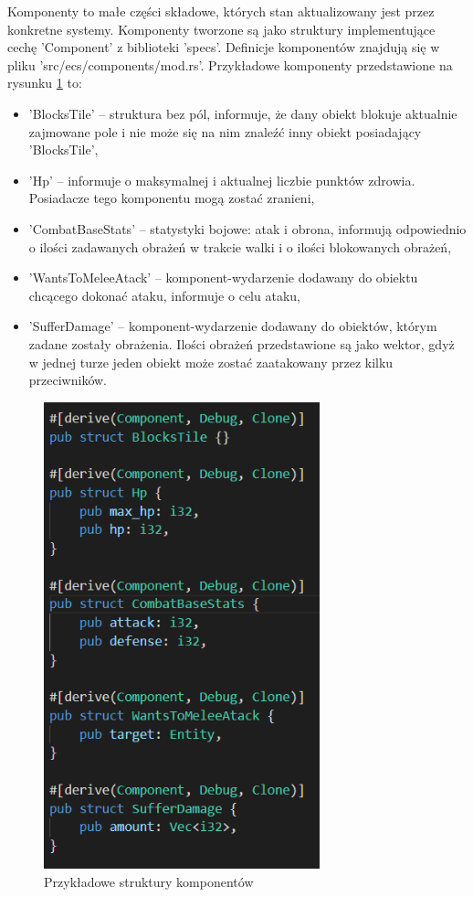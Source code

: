 \documentclass[12pt,twoside]{article}
\begin{document}
Komponenty to małe części składowe, których stan aktualizowany jest przez konkretne systemy. Komponenty tworzone są jako struktury implementujące cechę 'Component' z biblioteki 'specs'. Definicje komponentów znajdują się w pliku 'src/ecs/components/mod.rs'. Przykładowe komponenty przedstawione na rysunku \ref{code:comps} to:
\begin{itemize}	
	\item 'BlocksTile' -- struktura bez pól, informuje, że dany obiekt blokuje aktualnie zajmowane pole i nie może się na nim znaleźć inny obiekt posiadający 'BlocksTile',
	\item 'Hp' -- informuje o maksymalnej i aktualnej liczbie punktów zdrowia. Posiadacze tego komponentu mogą zostać zranieni,
	\item 'CombatBaseStats' -- statystyki bojowe: atak i obrona, informują odpowiednio o ilości zadawanych obrażeń w trakcie walki i o ilości blokowanych obrażeń,
	\item 'WantsToMeleeAtack' -- komponent-wydarzenie dodawany do obiektu chcącego dokonać ataku, informuje o celu ataku,
	\item 'SufferDamage' -- komponent-wydarzenie dodawany do obiektów, którym zadane zostały obrażenia. Ilości obrażeń przedstawione są jako wektor, gdyż w jednej turze jeden obiekt może zostać zaatakowany przez kilku przeciwników.
\end{itemize}
	
\FloatBarrier
\begin{figure}[ht]
	\centering
	\includegraphics[width=8cm]{images/code/comps.png}
	\caption{Przykładowe struktury komponentów}
	\label{code:comps}
\end{figure}
\FloatBarrier
\end{document}

